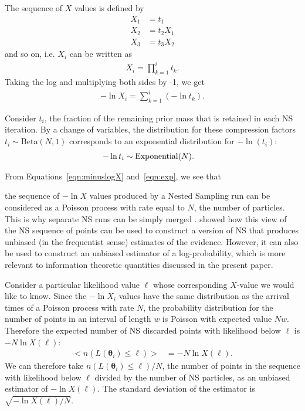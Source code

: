 \documentclass[entropy,article,accept,oneauthor,pdftex,10pt,a4paper]{mdpi}
\newcommand{\revision}{\color{darkblue}}
\newcommand{\x}{\boldsymbol{\theta}}
\begin{document}
{\revision
The sequence of $X$ values is defined by
\begin{align}
X_1 &= t_1 \\
X_2 &= t_2X_1 \\
X_3 &= t_3X_2
\end{align}
and so on, i.e. $X_i$ can be written as
\begin{align}
X_i = \prod_{k=1}^i t_k.
\end{align}
Taking the log and multiplying both sides by -1, we get
\begin{align}
-\ln X_i = \sum_{k=1}^i \left(-\ln t_k\right).\label{eqn:minuslogX}
\end{align}

Consider $t_i$, the fraction of the remaining prior mass that is retained
in each NS iteration. By a change of variables,
the distribution for these compression factors $t_i \sim $Beta$(N,1)$
corresponds to an exponential distribution for $-\ln(t_i)$:
\begin{align}
-\ln t_i &\sim \textnormal{Exponential}(N).\label{eqn:exp}
\end{align}

From Equations~\ref{eqn:minuslogX} and~\ref{eqn:exp}, we see that}
the sequence of $-\ln X$ values produced by a Nested Sampling run can be
considered as a Poisson process with rate equal to $N$, the number of
particles. This is why separate NS runs can be simply merged
\citep{skilling2006nested}.
\citet{Walter2017point} showed how this view of the NS sequence of points
can be used to construct a
version of NS that produces unbiased (in the frequentist sense)
estimates of the evidence.
However, it can also be used to construct an unbiased estimator of
a log-probability, which is more relevant to information theoretic
quantities discussed in the present paper.

Consider a particular likelihood value $\ell$ whose corresponding $X$-value
we would like to know. Since the $-\ln X_i$ values have the same distribution
as the arrival times of a Poisson process with rate $N$, the probability
distribution for the number of points in an interval of length $w$ is
Poisson with expected value $Nw$. Therefore the expected number of
NS discarded points with likelihood below $\ell$ is $-N\ln X(\ell)$:
\begin{align}
\big< n(L(\x_i) \leq \ell) \big> &= -N\ln X(\ell).
\end{align}
We can therefore take $n(L(\x_i) \leq \ell)/N$, the number of points in the
sequence with likelihood below $\ell$ divided by the number of NS particles,
as an unbiased estimator of $-\ln X(\ell)$. The standard deviation of the
estimator is $\sqrt{-\ln X(\ell)/N}$.
\end{document}
